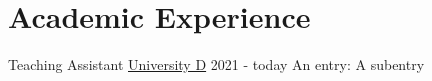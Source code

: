 
\section{Academic Experience}

\cvevent
{Teaching Assistant}
{\href{www.google.com}{University D}}
{2021 - today}
{
    \entry An entry:
    \smallskip
    \subentry A subentry
}
